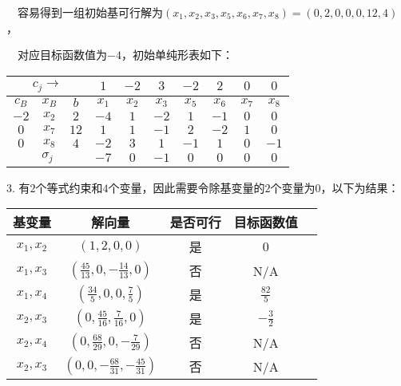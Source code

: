 \documentclass[cn,hazy,green,11pt,normal]{elegantnote}
\begin{document}
    $\quad$容易得到一组初始基可行解为$(x_1,x_2,x_3,x_5,x_6,x_7,x_8)=(0,2,0,0,0,12,4)$，

    $\quad$对应目标函数值为$-4$，初始单纯形表如下：

    \begin{table}[H]
        \centering
        \begin{tabular}{|c|c|c|c|c|c|c|c|c|c|}
            \hline
            \multicolumn{3}{|c|}{$c_j\rightarrow$} & $1$ & $-2$ & $3$ & $-2$ & $2$ & $0$ & $0$  \\
            \hline
            $c_B$ & $x_B$ & $b$ & $x_1$ & $x_2$ & $x_3$ & $x_5$ & $x_6$ & $x_7$ & $x_8$ \\
            \hline
            $-2 $& $x_2$ & $2$ & $-4$ & $1$ & $-2$ & $1$ & $-1$ & $0$ & $0$\\
            \hline
            $0$ & $x_7$ & $12$ & $1$ & $1$ & $-1$ & $2$ & $-2$ & $1$ & $0$\\
            \hline
            $0$ & $x_8$ & $4$ & $-2$ & $3$ & $1$ & $-1$ & $1$ & $0$ & $-1$\\
            \hline
            \multicolumn{3}{|c|}{$\sigma_j$} & $-7$ & $0$ & $-1$ & $0$ & $0$ & $0$ & $0$\\
            \hline
        \end{tabular}
    \end{table}

    $3.\,\,$有$2$个等式约束和$4$个变量，因此需要令除基变量的$2$个变量为$0$，以下为结果：

    \begin{table}[H]
        \centering
        \begin{tabular}{|c|c|c|c|c|}
            \hline
            基变量 & 解向量 & 是否可行 & 目标函数值 \\
            \hline
            $x_1,x_2$ & $(1,2,0,0)$ & 是 & $0$ \\
            \hline
            $x_1,x_3$ & $(\tfrac{45}{13},0,-\tfrac{14}{13},0)$ & 否 & N/A \\
            \hline
            $x_1,x_4$ & $(\tfrac{34}5,0,0,\tfrac75)$ & 是 & $\tfrac{82}5$ \\
            \hline
            $x_2,x_3$ & $(0,\tfrac{45}{16},\tfrac7{16},0)$ & 是 & $-\tfrac32$ \\
            \hline
            $x_2,x_4$ & $(0,\tfrac{68}{29},0,-\tfrac7{29})$ & 否 & N/A \\
            \hline
            $x_2,x_3$ & $(0,0,-\tfrac{68}{31},-\tfrac{45}{31})$ & 否 & N/A \\
            \hline
        \end{tabular}
    \end{table}
\end{document}
